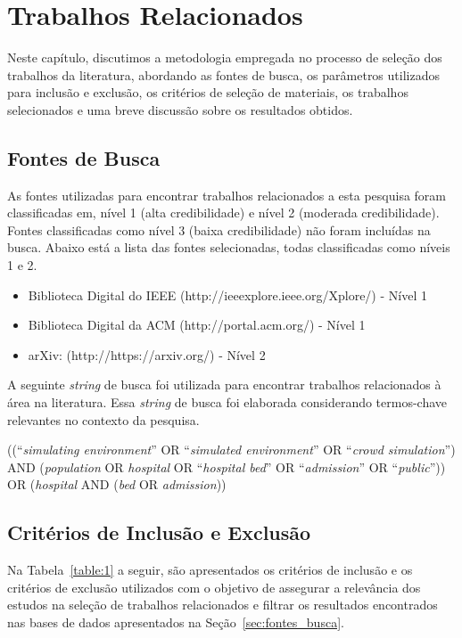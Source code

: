 \chapter{Trabalhos Relacionados} \label{cpt:lit}
Neste capítulo, discutimos a metodologia empregada no processo de seleção dos trabalhos da literatura, abordando as fontes de busca, os parâmetros utilizados para inclusão e exclusão, os critérios de seleção de materiais, os trabalhos selecionados e uma breve discussão sobre os resultados obtidos.

\section{\label{sec:fontes_busca}Fontes de Busca}
As fontes utilizadas para encontrar trabalhos relacionados a esta pesquisa foram classificadas em, nível 1 (alta credibilidade) e nível 2 (moderada credibilidade). Fontes classificadas como nível 3 (baixa credibilidade) não foram incluídas na busca. Abaixo está a lista das fontes selecionadas, todas classificadas como níveis 1 e 2.

\begin{itemize}
    \item Biblioteca Digital do IEEE (http://ieeexplore.ieee.org/Xplore/) - Nível 1
    \item Biblioteca Digital da ACM (http://portal.acm.org/) - Nível 1
    \item arXiv: (http://https://arxiv.org/) - Nível 2
\end{itemize}

A seguinte \textit{string} de busca foi utilizada para encontrar trabalhos relacionados à área na literatura. Essa \textit{string} de busca foi elaborada considerando termos-chave relevantes no contexto da pesquisa.

\begin{center}
((``\textit{simulating environment}'' OR ``\textit{simulated environment}'' OR ``\textit{crowd simulation}'') AND (\textit{population} OR \textit{hospital} OR ``\textit{hospital bed}'' OR ``\textit{admission}'' OR ``\textit{public}'')) OR (\textit{hospital} AND (\textit{bed} OR \textit{admission}))
\end{center}

\section{\label{sec:criterios}Critérios de Inclusão e Exclusão}
Na Tabela~\ref{table:1} a seguir, são apresentados os critérios de inclusão e os critérios de exclusão utilizados com o objetivo de assegurar a relevância dos estudos na seleção de trabalhos relacionados e filtrar os resultados encontrados nas bases de dados apresentados na Seção~\ref{sec:fontes_busca}.


